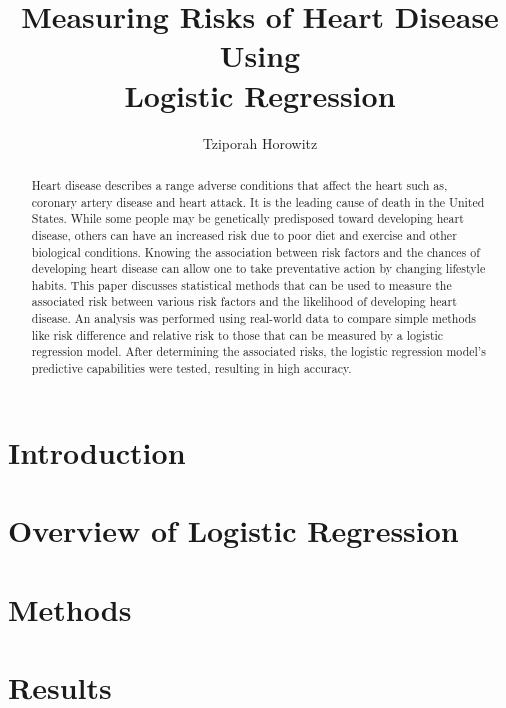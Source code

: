 \documentclass[journal,12pt,onecolumn]{article}
\begin{document}
\title{Measuring Risks of Heart Disease Using \\
Logistic Regression}
\author{Tziporah Horowitz}

\maketitle
\clearpage

\begin{abstract}
    Heart disease describes a range adverse conditions that affect the heart such as, coronary artery disease and heart attack. 
    It is the leading cause of death in the United States.
    While some people may be genetically predisposed toward developing heart disease, others can have an increased risk due to poor diet and exercise and other biological conditions.
    Knowing the association between risk factors and the chances of developing heart disease can allow one to take preventative action by changing lifestyle habits.
    This paper discusses statistical methods that can be used to measure the associated risk between various risk factors and the likelihood of developing heart disease. An analysis was performed using real-world data to compare simple methods like risk difference and relative risk to those that can be measured by a logistic regression model.
    After determining the associated risks, the logistic regression model's predictive capabilities were tested, resulting in high accuracy.
\end{abstract}
\clearpage


\section{Introduction}


\section{Overview of Logistic Regression}


\section{Methods}


\section{Results}\label{sec:Results}

\end{document}
